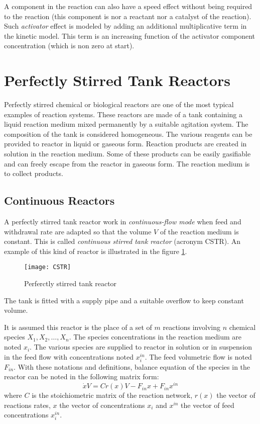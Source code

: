 A component in the reaction can also have a speed effect without being required to the reaction
(this component is nor a reactant nor a catalyst of the reaction).
Such {\it activator} effect is modeled by adding an additional multiplicative term in the kinetic model.
This term is an increasing function of the activator component concentration (which is non zero at start).

\section{Perfectly Stirred Tank Reactors}

Perfectly stirred chemical or biological reactors are one of the most typical examples of reaction systems. These reactors are made of a tank containing a liquid reaction medium mixed permanently by a suitable agitation system. The composition of the tank is considered homogeneous. The various reagents can be provided to reactor in liquid or gaseous form. Reaction products are created in solution in the reaction medium. Some of these products can be  easily gasifiable and can freely escape from the reactor in gaseous form.
The reaction medium is  to collect products.

\subsection {Continuous Reactors}

A perfectly stirred tank reactor work in {\em continuous-flow mode} when feed and withdrawal rate are adapted so that the volume $V$ of the reaction medium is constant.
This is called {\em continuous stirred tank reactor} (acronym CSTR).
An example of this kind of reactor is illustrated in the figure \ref{Fig:CSTR}. 
\begin{figure}[htbp] 
   \centering
   \texttt{[image: CSTR]} 
   \caption{Perferctly stirred tank reactor}
   \label{Fig:CSTR}
\end{figure}
The tank is fitted with a supply pipe and a suitable overflow to keep constant volume.

It is assumed this reactor is the place of a set of $m$ reactions involving $n$ chemical species $X_1, X_2, \dots , X_n$.
The species concentrations in the reaction medium are noted $x_i$.
The various species are supplied to reactor in solution or in suspension in the feed flow with concentrations noted $x_i^{in}$.
The feed volumetric flow is noted $F_{in}$. With these notations and definitions, balance equation of the species in the reactor can be noted in the following matrix form:
$$
\dot xV = Cr(x)V - F_{in}x + F_{in}x^{in}
$$
where $C$ is the stoichiometric matrix of the reaction network, $r(x)$ the vector of reactions rates, $x$ the vector of concentrations $x_i$ and $x^{in}$ the vector of feed concentrations $x_i^{in}$.

